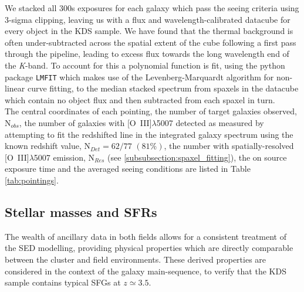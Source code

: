 \documentclass[fleqn,usenatbib]{mnras}
\begin{document}
We stacked all 300s exposures for each galaxy which pass the seeing criteria using 3-sigma clipping, leaving us with a flux and wavelength-calibrated datacube for every object in the KDS sample.
We have found that the thermal background is often under-subtracted across the spatial extent of the cube following a first pass through the pipeline, leading to excess flux towards the long wavelength end of the {\it K}-band.
To account for this a polynomial function is fit, using the python package {\tt LMFIT} \citep{Newville2014} which makes use of the Levenberg-Marquardt algorithm for non-linear curve fitting, to the median stacked spectrum from spaxels in the datacube which contain no object flux and then subtracted from each spaxel in turn. \\

The central coordinates of each pointing, the number of target galaxies observed, N$_{obs}$, the number of galaxies with [O~{\sc III}]$\lambda$5007 detected as measured by attempting to fit the redshifted line in the integrated galaxy spectrum using the known redshift value, N$_{Det} = 62/77$ $(81\%)$, the number with spatially-resolved [O~{\sc III}]$\lambda$5007 emission, N$_{Res}$ (see \cref{subsubsection:spaxel_fitting}), the on source exposure time and the averaged seeing conditions are listed in Table \ref{tab:pointings}.

\subsection{Stellar masses and SFRs}\label{subsec:stellar_masses_and_sfrs}
The wealth of ancillary data in both fields allows for a consistent treatment of the SED modelling, providing physical properties which are directly comparable between the cluster and field environments.
These derived properties are considered in the context of the galaxy main-sequence, to verify that the KDS sample contains typical SFGs at $z\simeq3.5$.   
\end{document}
